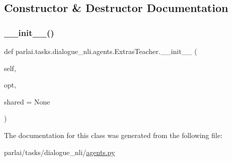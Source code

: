 \subsection{Constructor \& Destructor Documentation}
\mbox{\label{classparlai_1_1tasks_1_1dialogue__nli_1_1agents_1_1ExtrasTeacher_a5713e0c8aa5f0dc996004e7028c7725b}} 
\subsubsection{\texorpdfstring{\+\_\+\+\_\+init\+\_\+\+\_\+()}{\_\_init\_\_()}}
{\footnotesize\ttfamily def parlai.\+tasks.\+dialogue\+\_\+nli.\+agents.\+Extras\+Teacher.\+\_\+\+\_\+init\+\_\+\+\_\+ (\begin{DoxyParamCaption}\item[{}]{self,  }\item[{}]{opt,  }\item[{}]{shared = {\ttfamily None} }\end{DoxyParamCaption})}



The documentation for this class was generated from the following file\+:\begin{DoxyCompactItemize}
\item 
parlai/tasks/dialogue\+\_\+nli/\hyperlink{parlai_2tasks_2dialogue__nli_2agents_8py}{agents.\+py}\end{DoxyCompactItemize}
